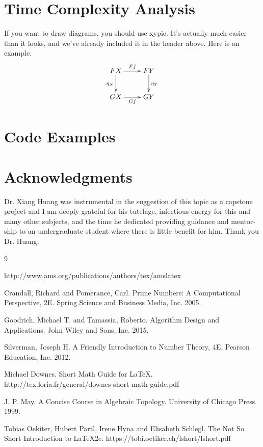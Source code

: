 \documentclass[psamsfonts]{amsart}
\theoremstyle{definition}
\theoremstyle{remark}
\numberwithin{equation}{section}
\begin{document}
\section{Time Complexity Analysis}

If you want to draw diagrams, you should use xypic.  It's actually
much easier than it looks, and we've already included it in the header
above.  Here is an example. 
\[\xymatrix{
FX \ar[r]^-{Ff} \ar[d]_{\eta_X} & FY \ar[d]^{\eta_Y} \\
GX \ar[r]_-{Gf} & GY\\} \]

\section{Code Examples}

\section*{Acknowledgments}  
Dr. Xiang Huang was instrumental in the suggestion of this topic as a capstone project and I am deeply grateful for his tutelage, infectious energy for this and many other subjects, and the time he dedicated providing guidance and mentor-ship to an undergraduate student where there is little benefit for him. Thank you Dr. Huang. 

\begin{thebibliography}{9}

 http://www.ams.org/publications/authors/tex/amslatex

Crandall, Richard and Pomerance, Carl.
Prime Numbers: A Computational Perspective, 2E.
Spring Science and Business Media, Inc. 2005.

Goodrich, Michael T. and Tamassia, Roberto.
Algorithm Design and Applications.
John Wiley and Sons, Inc. 2015. 

Silverman, Joseph H.
A Friendly Introduction to Number Theory, 4E.
Pearson Education, Inc. 2012.

Michael Downes.
Short Math Guide for \LaTeX.
http://tex.loria.fr/general/downes-short-math-guide.pdf

J. P. May.
A Concise Course in Algebraic Topology.
University of Chicago Press. 1999. 

Tobias Oekiter, Hubert Partl, Irene Hyna and Elisabeth Schlegl.
The Not So Short Introduction to \LaTeX 2e.
https://tobi.oetiker.ch/lshort/lshort.pdf

\end{thebibliography}
\end{document}

